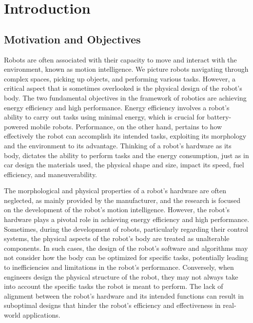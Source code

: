 \chapter*{Introduction}
\label{chp:00-Prologue}

\section*{Motivation and Objectives}

Robots are often associated with their capacity to move and interact with the environment, known as motion intelligence. We picture robots navigating through complex spaces, picking up objects, and performing various tasks. However, a critical aspect that is sometimes overlooked is the physical design of the robot's body. The two fundamental objectives in the framework of robotics are achieving energy efficiency and high performance. Energy efficiency involves a robot's ability to carry out tasks using minimal energy, which is crucial for battery-powered mobile robots. Performance, on the other hand, pertains to how effectively the robot can accomplish its intended tasks, exploiting its morphology and the environment to its advantage. Thinking of a robot's hardware as its body, dictates the ability to perform tasks and the energy consumption, just as in car design the materials used, the physical shape and size, impact its speed, fuel efficiency, and maneuverability.

The morphological and physical properties of a robot's hardware are often neglected, as mainly provided by the manufacturer, and the research is focused on the development of the robot's motion intelligence. However, the robot's hardware plays a pivotal role in achieving energy efficiency and high performance.
Sometimes, during the development of robots, particularly regarding their control systems, the physical aspects of the robot's body are treated as unalterable components. In such cases, the design of the robot's software and algorithms may not consider how the body can be optimized for specific tasks, potentially leading to inefficiencies and limitations in the robot's performance. Conversely, when engineers design the physical structure of the robot, they may not always take into account the specific tasks the robot is meant to perform. The lack of alignment between the robot's hardware and its intended functions can result in suboptimal designs that hinder the robot's efficiency and effectiveness in real-world applications.


